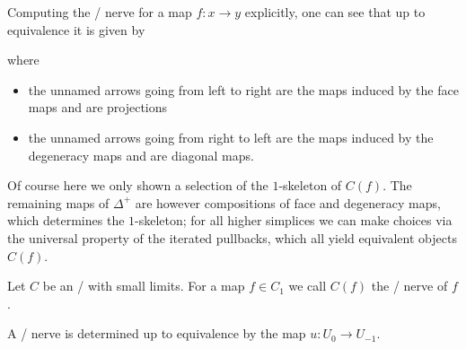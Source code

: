 \begin{remark}
    Computing the \Cech/ nerve for a map $f\colon x\to y$ explicitly, one can see that up to equivalence it is given by
    \begin{center}
    \end{center}
    where
    \begin{itemize}
        \item the unnamed arrows going from left to right are the maps induced by the face maps and are projections 
        \item the unnamed arrows going from right to left are the maps induced by the degeneracy maps and are diagonal maps. 
    \end{itemize}
    Of course here we only shown a selection of the $1$-skeleton of $C(f)$.
    The remaining maps of $\Delta^+$ are however compositions of face and degeneracy maps, which determines the $1$-skeleton; for all higher simplices we can make choices via the universal property of the iterated pullbacks, which all yield equivalent objects $C(f)$. %
\end{remark}
\begin{definition}
    Let $C$ be an \inftycat/ with small limits. 
    For a map $f\in C_1$ we call $C(f)$ the \Cech/ nerve of $f$.
\end{definition}
\begin{lemma}
    A \Cech/ nerve is determined up to equivalence by the map $u\colon U_0\to U_{-1}$.
\end{lemma}
